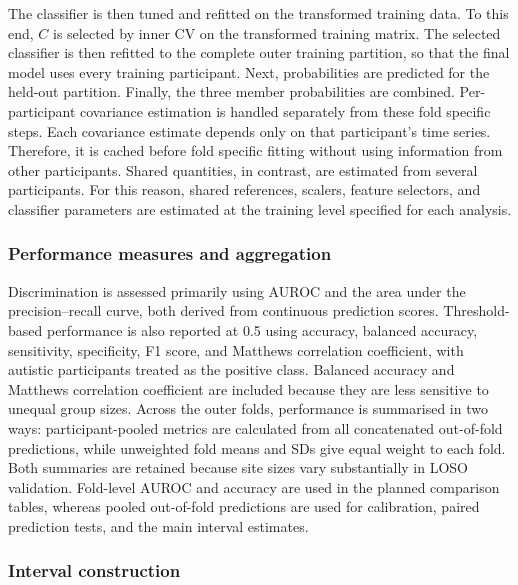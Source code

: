 The classifier is then tuned and refitted on the transformed training data. To this end,
$C$ is selected by inner CV on the transformed training matrix. The selected
classifier is then refitted to the complete outer training partition, so that the final
model uses every training participant. Next, probabilities are predicted for the held-out
partition. Finally, the three member probabilities are combined. Per-participant covariance estimation is handled separately from these fold specific
steps. Each covariance estimate depends only on that participant's time series. Therefore,
it is cached before fold specific fitting without using information from other
participants. Shared quantities, in contrast, are estimated from several participants. For
this reason, shared references, scalers, feature selectors, and classifier parameters are
estimated at the training level specified for each analysis.

\subsubsection{Performance measures and aggregation}
\label{subsubsec:performance-measures}

Discrimination is assessed primarily using AUROC and the area under the precision--recall curve, both derived from continuous prediction scores. Threshold-based performance is also reported at 0.5 using accuracy, balanced accuracy, sensitivity, specificity, F1 score, and Matthews correlation coefficient, with autistic participants treated as the positive class. Balanced accuracy and Matthews correlation coefficient are included because they are less sensitive to unequal group sizes. Across the outer folds, performance is summarised in two ways: participant-pooled metrics are calculated from all concatenated out-of-fold predictions, while unweighted fold means and SDs give equal weight to each fold. Both summaries are retained because site sizes vary substantially in LOSO validation. Fold-level AUROC and accuracy are used in the planned comparison tables, whereas pooled out-of-fold predictions are used for calibration, paired prediction tests, and the main interval estimates.

\subsubsection{Interval construction}
\label{subsubsec:interval-construction}

